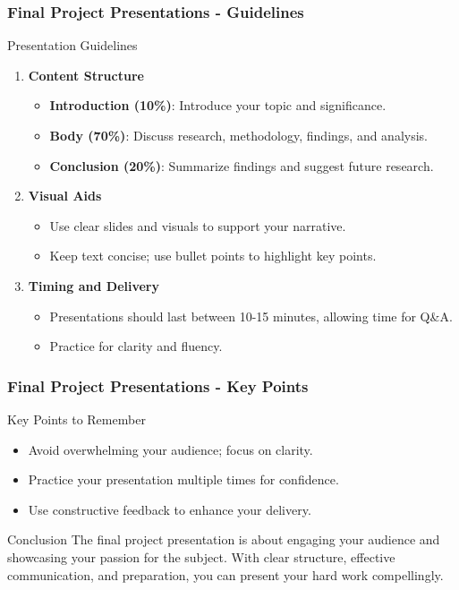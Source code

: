 \documentclass[aspectratio=169]{beamer}
\begin{document}
\begin{frame}[fragile]
    \frametitle{Final Project Presentations - Guidelines}
    \begin{block}{Presentation Guidelines}
        \begin{enumerate}
            \item \textbf{Content Structure}
                \begin{itemize}
                    \item \textbf{Introduction (10\%)}: Introduce your topic and significance.
                    \item \textbf{Body (70\%)}: Discuss research, methodology, findings, and analysis.
                    \item \textbf{Conclusion (20\%)}: Summarize findings and suggest future research.
                \end{itemize}
            
            \item \textbf{Visual Aids}
                \begin{itemize}
                    \item Use clear slides and visuals to support your narrative.
                    \item Keep text concise; use bullet points to highlight key points.
                \end{itemize} 

            \item \textbf{Timing and Delivery}
                \begin{itemize}
                    \item Presentations should last between 10-15 minutes, allowing time for Q\&A.
                    \item Practice for clarity and fluency.
                \end{itemize} 
        \end{enumerate}
    \end{block}
\end{frame}

\begin{frame}[fragile]
    \frametitle{Final Project Presentations - Key Points}
    \begin{block}{Key Points to Remember}
        \begin{itemize}
            \item Avoid overwhelming your audience; focus on clarity.
            \item Practice your presentation multiple times for confidence.
            \item Use constructive feedback to enhance your delivery.
        \end{itemize}
    \end{block}
    
    \begin{block}{Conclusion}
        The final project presentation is about engaging your audience and showcasing your passion for the subject. 
        With clear structure, effective communication, and preparation, you can present your hard work compellingly.
    \end{block}
\end{frame}
\end{document}
